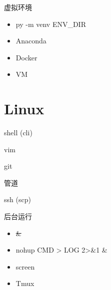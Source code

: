 \documentclass{beamer}
\begin{document}
\begin{frame}{虚拟环境}
    \begin{itemize}
        \item py -m venv ENV\_DIR
        \item Anaconda
        \item Docker
        \item VM
    \end{itemize}
\end{frame}

\section{Linux}

\begin{frame}{shell (cli)}
    \begin{itemize}
    \end{itemize}
\end{frame}

\begin{frame}{vim}
    \begin{itemize}
    \end{itemize}
\end{frame}

\begin{frame}{git}
    \begin{itemize}
    \end{itemize}
\end{frame}

\begin{frame}{管道}
    \begin{itemize}
    \end{itemize}
\end{frame}

\begin{frame}{ssh (scp)}
    \begin{itemize}
    \end{itemize}
\end{frame}

\begin{frame}{后台运行}
    \begin{itemize}
        \item \sout{\&}
        \item nohup CMD > LOG 2>\&1 \&
        \item screen
        \item Tmux
    \end{itemize}
\end{frame}
\end{document}
